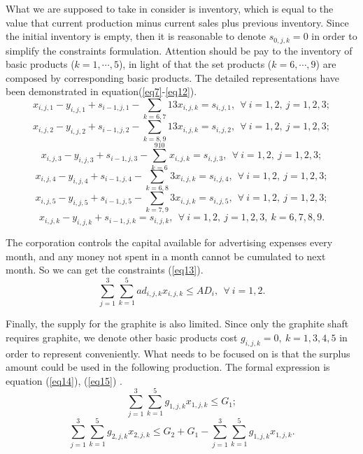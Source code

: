 \documentclass[12pt]{article}
\begin{document}
	\noindent What we are supposed to take in consider is inventory, which is equal to the value that current production minus current sales plus previous inventory. Since the initial inventory is empty, then it is reasonable to denote $s_{0,j,k}=0$ in order to simplify the constraints formulation. Attention should be pay to the inventory of basic products ($k=1,\cdots,5$), in light of that the set products ($k=6,\cdots,9$) are composed by corresponding basic products. The detailed representations have been demonstrated in equation(\ref{eq7}-\ref{eq12}).
	\begin{equation}
		\label{eq7}
		x_{i,j,1}-y_{i,j,1}+s_{i-1,j,1}-\sum\limits_{k=6,7}13x_{i,j,k}= s_{i,j,1},\ \ \forall\ i=1,2,\ j=1,2,3;
	\end{equation}
	\begin{equation}
		\label{eq8}
		x_{i,j,2}-y_{i,j,2}+s_{i-1,j,2}-\sum\limits_{k=8,9}13x_{i,j,k} = s_{i,j,2},\ \ \forall\ i=1,2,\ j=1,2,3;
	\end{equation}
	\begin{equation}
		\label{eq9}
		x_{i,j,3}-y_{i,j,3}+s_{i-1,j,3}-\sum\limits_{k=6}^910x_{i,j,k} = s_{i,j,3},\ \ \forall\ i=1,2,\ j=1,2,3;
	\end{equation}
	\begin{equation}
		\label{eq10}
		x_{i,j,4}-y_{i,j,4}+s_{i-1,j,4}-\sum\limits_{k=6,8}3x_{i,j,k} = s_{i,j,4},\ \ \forall\ i=1,2,\ j=1,2,3;
	\end{equation}
	\begin{equation}
		\label{eq11}
		x_{i,j,5}-y_{i,j,5}+s_{i-1,j,5}-\sum\limits_{k=7,9}3x_{i,j,k} = s_{i,j,5},\ \ \forall\ i=1,2,\ j=1,2,3;
	\end{equation}
	\begin{equation}
		\label{eq12}
		x_{i,j,k}-y_{i,j,k}+s_{i-1,j,k} = s_{i,j,k},\ \ \forall\ i=1,2,\ j=1,2,3,\ k=6,7,8,9.
	\end{equation}
	
	\noindent The corporation controls the capital available for advertising expenses every month, and any money not spent in a month cannot be cumulated to next month. So we can get the constraints (\ref{eq13}).
	\begin{equation}
		\label{eq13}
	\sum\limits_{j=1}^3\sum\limits_{k=1}^5ad_{i,j,k}x_{i,j,k}\le AD_i,\ \ \forall\ i=1,2.
	\end{equation}

	\noindent Finally, the supply for the graphite is also limited. Since only the graphite shaft requires graphite, we denote other basic products cost $g_{i,j,k}=0,\ k=1,3,4,5$ in order to represent conveniently. What needs to be focused on is that the surplus amount could be used in the following production. The formal expression is equation (\ref{eq14}), (\ref{eq15}) .
	\begin{equation}
		\label{eq14}
		\sum\limits_{j=1}^3\sum\limits_{k=1}^5g_{1,j,k}x_{1,j,k}\leq G_1;
	\end{equation}
	\begin{equation}
		\label{eq15}
		\sum\limits_{j=1}^3\sum\limits_{k=1}^5g_{2,j,k}x_{2,j,k}\leq G_2+G_1-\sum\limits_{j=1}^3\sum\limits_{k=1}^5g_{1,j,k}x_{1,j,k}.
	\end{equation}
	
\end{document}
